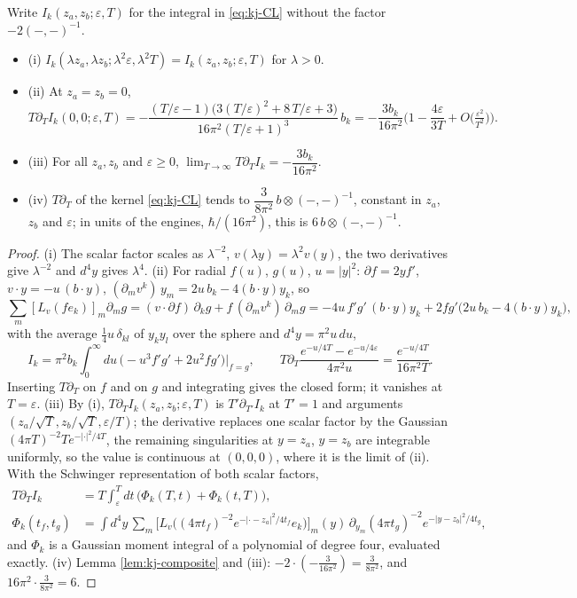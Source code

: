 \begin{proposition}
\label{prop:kj-composite}
Write $I_k(z_a,z_b;\varepsilon,T)$ for the integral in \eqref{eq:kj-CL} without the factor $-2(-,-)^{-1}$.
\begin{itemize}
\item (i) $I_k(\lambda z_a,\lambda z_b;\lambda^2\varepsilon,\lambda^2T)=I_k(z_a,z_b;\varepsilon,T)$ for $\lambda>0$.
\item (ii) At $z_a=z_b=0$,
\[
T\partial_TI_k(0,0;\varepsilon,T)=-\frac{(T/\varepsilon-1)\big(3(T/\varepsilon)^2+8\,T/\varepsilon+3\big)}{16\pi^2(T/\varepsilon+1)^3}\,b_k=-\frac{3b_k}{16\pi^2}\Big(1-\frac{4\varepsilon}{3T}+O\big(\tfrac{\varepsilon^2}{T^2}\big)\Big).
\]
\item (iii) For all $z_a,z_b$ and $\varepsilon\ge0$, $\lim_{T\to\infty}T\partial_TI_k=-\dfrac{3b_k}{16\pi^2}$.
\item (iv) $T\partial_T$ of the kernel \eqref{eq:kj-CL} tends to $\dfrac{3}{8\pi^2}\,b\otimes(-,-)^{-1}$, constant in $z_a$, $z_b$ and $\varepsilon$; in units of the engines, $\hbar/(16\pi^2)$, this is $6\,b\otimes(-,-)^{-1}$.
\end{itemize}
\end{proposition}

\begin{proof}
(i) The scalar factor scales as $\lambda^{-2}$, $v(\lambda y)=\lambda^2v(y)$, the two derivatives give $\lambda^{-2}$ and $d^4y$ gives $\lambda^4$. (ii) For radial $f(u)$, $g(u)$, $u=|y|^2$: $\partial f=2yf'$, $v\cdot y=-u\,(b\cdot y)$, $(\partial_mv^k)\,y_m=2u\,b_k-4(b\cdot y)y_k$, so
\[
\sum_m[L_v(fe_k)]_m\partial_mg=(v\cdot\partial f)\,\partial_kg+f\,(\partial_mv^k)\,\partial_mg=-4u\,f'g'\,(b\cdot y)y_k+2fg'\big(2u\,b_k-4(b\cdot y)y_k\big),
\]
with the average $\tfrac14u\,\delta_{kl}$ of $y_ky_l$ over the sphere and $d^4y=\pi^2u\,du$,
\[
I_k=\pi^2b_k\int_0^\infty du\,\big(-u^3f'g'+2u^2fg'\big)\Big|_{f=g},\qquad T\partial_T\frac{e^{-u/4T}-e^{-u/4\varepsilon}}{4\pi^2u}=\frac{e^{-u/4T}}{16\pi^2T}.
\]
Inserting $T\partial_T$ on $f$ and on $g$ and integrating gives the closed form; it vanishes at $T=\varepsilon$. (iii) By (i), $T\partial_TI_k(z_a,z_b;\varepsilon,T)$ is $T'\partial_{T'}I_k$ at $T'=1$ and arguments $(z_a/\sqrt T,z_b/\sqrt T,\varepsilon/T)$; the derivative replaces one scalar factor by the Gaussian $(4\pi T)^{-2}Te^{-|\cdot|^2/4T}$, the remaining singularities at $y=z_a$, $y=z_b$ are integrable uniformly, so the value is continuous at $(0,0,0)$, where it is the limit of (ii). With the Schwinger representation of both scalar factors,
\[
\begin{aligned}
T\partial_TI_k&=T\int_\varepsilon^Tdt\,\big(\Phi_k(T,t)+\Phi_k(t,T)\big),\\
\Phi_k(t_f,t_g)&=\int d^4y\,\sum_m\big[L_v\big((4\pi t_f)^{-2}e^{-|\cdot-z_a|^2/4t_f}e_k\big)\big]_m(y)\,\partial_{y_m}(4\pi t_g)^{-2}e^{-|y-z_b|^2/4t_g},
\end{aligned}
\]
and $\Phi_k$ is a Gaussian moment integral of a polynomial of degree four, evaluated exactly. (iv) Lemma \ref{lem:kj-composite} and (iii): $-2\cdot(-\tfrac{3}{16\pi^2})=\tfrac{3}{8\pi^2}$, and $16\pi^2\cdot\tfrac{3}{8\pi^2}=6$.
\end{proof}

